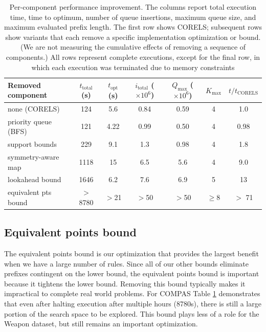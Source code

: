 \begin{table}[t!]
\begin{adjustwidth}{-.4in}{-.4in}
\begin{tabular}{l | c | c | c | c | c | c} 
  Removed component & $t_\text{total}$ (s) & $t_\text{opt}$ (s) & $i_\text{total}$ ($\times 10^6$) & $Q_\text{max}$ ($\times 10^6$) & $K_\text{max}$ & $t/t_\text{CORELS}$ \\
\hline
none (CORELS) & 124 & 5.6 & 0.84 & 0.59 & 4 & 1.0 \\
priority queue (BFS) & 121 & 4.22 & 0.99 & 0.50 & 4 & 0.98 \\
support bounds & 229 & 9.1 & 1.3 & 0.98 & 4 & 1.8 \\
symmetry-aware map & 1118 & 15 & 6.5 & 5.6 & 4 & 9.0\\
lookahead bound & 1646 & 6.2 & 7.6 & 6.9 & 5 & 13 \\
equivalent pts bound & $>$8780 & $>$21 & $>$50 & $>$50 & $\ge$8 & $>$ 71
\end{tabular}
\vspace{3mm}
\caption{Per-component performance improvement.
%
The columns report total execution time,
time to optimum, number of queue insertions,
maximum queue size, and maximum evaluated prefix length.
%
The first row shows CORELS; subsequent rows show variants
that each remove a specific implementation optimization or bound.
%
(We are not measuring the cumulative effects of removing a sequence of components.)
%
All rows represent complete executions, except for the final row,
in which each execution was terminated due to memory constraints
}
\end{adjustwidth}
\label{tab:compas}
\end{table}

\subsection{Equivalent points bound}

The equivalent points bound is our optimization that provides the largest benefit when we have a large number of rules.
Since all of our other bounds eliminate prefixes contingent on the lower bound, the equivalent points bound is important because it tightens the lower bound.
Removing this bound typically makes it impractical to complete real world problems.
For COMPAS Table \ref{tab:compas} demonstrates that even after halting execution after multiple hours (8780s), there is still a large portion of the search space to be explored.
This bound plays less of a role for the Weapon dataset, but still remains an important optimization.

